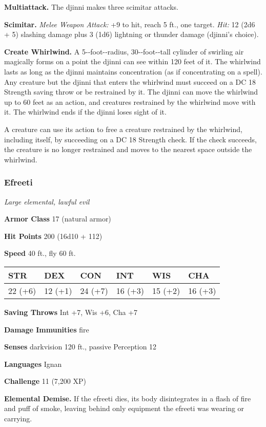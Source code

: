 \documentclass[
]{article}
\begin{document}
\textbf{Multiattack.} The djinni makes three scimitar attacks.

\textbf{Scimitar.} \emph{Melee Weapon Attack:} +9 to hit, reach 5 ft.,
one target. \emph{Hit:} 12 (2d6 + 5) slashing damage plus 3 (1d6)
lightning or thunder damage (djinni's choice).

\textbf{Create Whirlwind.} A 5-­‐foot-­‐radius, 30-­‐foot-­‐tall
cylinder of swirling air magically forms on a point the djinni can see
within 120 feet of it. The whirlwind lasts as long as the djinni
maintains concentration (as if concentrating on a spell). Any creature
but the djinni that enters the whirlwind must succeed on a DC 18
Strength saving throw or be restrained by it. The djinni can move the
whirlwind up to 60 feet as an action, and creatures restrained by the
whirlwind move with it. The whirlwind ends if the djinni loses sight of
it.

A creature can use its action to free a creature restrained by the
whirlwind, including itself, by succeeding on a DC 18 Strength check. If
the check succeeds, the creature is no longer restrained and moves to
the nearest space outside the whirlwind.

\hypertarget{efreeti}{%
\subsubsection{Efreeti}\label{efreeti}}

\emph{Large elemental, lawful evil}

\textbf{Armor Class} 17 (natural armor)

\textbf{Hit Points} 200 (16d10 + 112)

\textbf{Speed} 40 ft., fly 60 ft.

\begin{longtable}[]{@{}llllll@{}}
\toprule
STR & DEX & CON & INT & WIS & CHA\tabularnewline
\midrule
\endhead
22 (+6) & 12 (+1) & 24 (+7) & 16 (+3) & 15 (+2) & 16 (+3)\tabularnewline
\bottomrule
\end{longtable}

\textbf{Saving Throws} Int +7, Wis +6, Cha +7

\textbf{Damage Immunities} fire

\textbf{Senses} darkvision 120 ft., passive Perception 12

\textbf{Languages} Ignan

\textbf{Challenge} 11 (7,200 XP)

\textbf{Elemental Demise.} If the efreeti dies, its body disintegrates
in a flash of fire and puff of smoke, leaving behind only equipment the
efreeti was wearing or carrying.
\end{document}
